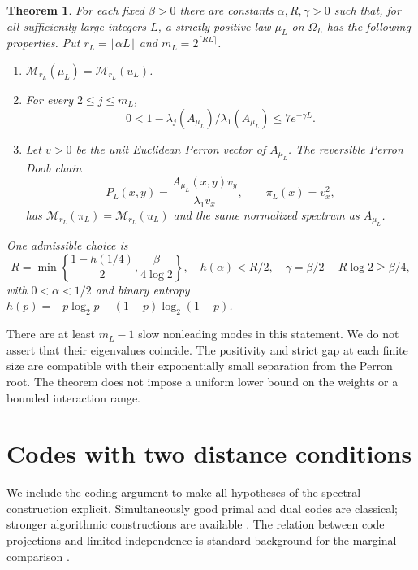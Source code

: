 \documentclass[11pt]{article}
\newtheorem{theorem}{Theorem}
\begin{document}
\begin{theorem}\label{thm:main}
For each fixed $\beta>0$ there are constants $\alpha,R,\gamma>0$ such
that, for all sufficiently large integers $L$, a strictly positive law
$\mu_L$ on $\Omega_L$ has the following properties. Put
$r_L=\lfloor\alpha L\rfloor$ and $m_L=2^{\lceil RL\rceil}$.
\begin{enumerate}
\item $\mathcal M_{r_L}(\mu_L)=\mathcal M_{r_L}(u_L)$.
\item For every $2\le j\le m_L$,
\begin{equation}\label{eq:slow}
 0<1-\lambda_j(A_{\mu_L})/\lambda_1(A_{\mu_L})
                 \le 7e^{-\gamma L}.
\end{equation}
\item Let $v>0$ be the unit Euclidean Perron vector of $A_{\mu_L}$.
The reversible Perron Doob chain
\begin{equation}\label{eq:doob}
 P_L(x,y)=\frac{A_{\mu_L}(x,y)v_y}{\lambda_1 v_x},
 \qquad \pi_L(x)=v_x^2,
\end{equation}
has $\mathcal M_{r_L}(\pi_L)=\mathcal M_{r_L}(u_L)$ and the same
normalized spectrum as $A_{\mu_L}$.
\end{enumerate}
One admissible choice is
\begin{equation}\label{eq:parameters}
 R=\min\left\{\frac{1-h(1/4)}2,\frac{\beta}{4\log 2}\right\},
 \quad h(\alpha)<R/2,\quad
 \gamma=\beta/2-R\log 2\ge\beta/4,
\end{equation}
with $0<\alpha<1/2$ and binary entropy
$h(p)=-p\log_2p-(1-p)\log_2(1-p)$.
\end{theorem}

There are at least $m_L-1$ slow nonleading modes in this statement.
We do not assert that their eigenvalues coincide. The positivity and
strict gap at each finite size are compatible with their exponentially
small separation from the Perron root. The theorem does not impose a
uniform lower bound on the weights or a bounded interaction range.

\section{Codes with two distance conditions}
We include the coding argument to make all hypotheses of the spectral
construction explicit. Simultaneously good primal and dual codes are
classical; stronger algorithmic constructions are available
\cite{BrehmResch}. The relation between code projections and limited
independence is standard background for the marginal comparison
\cite{AGM}.
\end{document}
